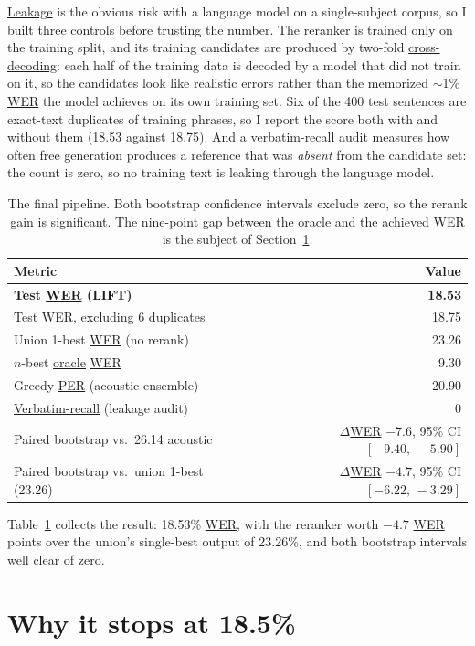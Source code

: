 \documentclass{article}
\DeclareRobustCommand{\glref}[2]{\hyperlink{gl:#1}{\textcolor{glosslink}{#2}}}
\DeclareRobustCommand{\wer}{\glref{wer}{WER}}
\DeclareRobustCommand{\per}{\glref{per}{PER}}
\begin{document}
\glref{leakage}{Leakage} is the obvious risk with a language model on a single-subject corpus, so I
built three controls before trusting the number. The reranker is trained only on the training split,
and its training candidates are produced by two-fold \glref{crossdecode}{cross-decoding}: each half of
the training data is decoded by a model that did not train on it, so the candidates look like
realistic errors rather than the memorized $\sim$1\% \wer{} the model achieves on its own training
set. Six of the 400 test sentences are exact-text duplicates of training phrases, so I report the
score both with and without them (18.53 against 18.75). And a
\glref{verbatim}{verbatim-recall audit} measures how often free generation produces a reference that
was \emph{absent} from the candidate set: the count is zero, so no training text is leaking through
the language model.

\begin{table}[t]
\centering
\small
\caption{The final pipeline. Both bootstrap confidence intervals exclude zero, so the rerank gain is
significant. The nine-point gap between the oracle and the achieved \wer{} is the subject of
Section~\ref{sec:limit}.}
\label{tab:final}
\begin{tabular}{@{}l r@{}}
\toprule
Metric & Value \\
\midrule
\textbf{Test \wer{} (LIFT)} & \textbf{18.53} \\
Test \wer{}, excluding 6 duplicates & 18.75 \\
Union 1-best \wer{} (no rerank) & 23.26 \\
$n$-best \glref{oracle}{oracle} \wer{} & 9.30 \\
Greedy \per{} (acoustic ensemble) & 20.90 \\
\glref{verbatim}{Verbatim-recall} (leakage audit) & 0 \\
\addlinespace[3pt]
Paired bootstrap vs.\ 26.14 acoustic & $\Delta$\wer{} $-7.6$, 95\% CI $[-9.40,\,-5.90]$ \\
Paired bootstrap vs.\ union 1-best (23.26) & $\Delta$\wer{} $-4.7$, 95\% CI $[-6.22,\,-3.29]$ \\
\bottomrule
\end{tabular}
\end{table}

Table~\ref{tab:final} collects the result: 18.53\% \wer{}, with the reranker worth $-4.7$ \wer{}
points over the union's single-best output of 23.26\%, and both bootstrap intervals well clear of
zero.

\section{Why it stops at 18.5\%}
\label{sec:limit}
\end{document}
